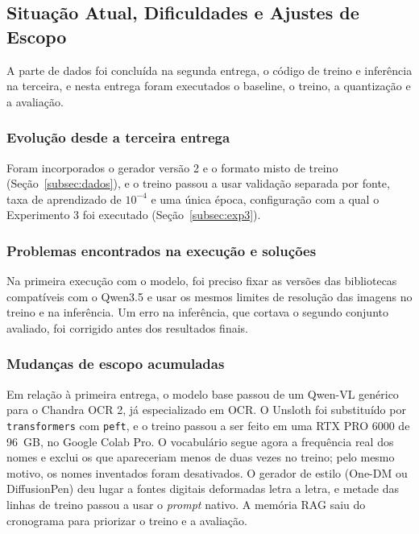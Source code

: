 \documentclass[12pt,a4paper]{article}
\begin{document}
\subsection{Situação Atual, Dificuldades e Ajustes de Escopo}
\label{subsec:ajustes}

A parte de dados foi concluída na segunda entrega, o código de treino e inferência na terceira, e nesta entrega foram executados o baseline, o treino, a quantização e a avaliação.

\subsubsection{Evolução desde a terceira entrega}
Foram incorporados o gerador versão 2 e o formato misto de treino (Seção~\ref{subsec:dados}), e o treino passou a usar validação separada por fonte, taxa de aprendizado de $10^{-4}$ e uma única época, configuração com a qual o Experimento 3 foi executado (Seção~\ref{subsec:exp3}).

\subsubsection{Problemas encontrados na execução e soluções}
\label{subsec:problemas}
Na primeira execução com o modelo, foi preciso fixar as versões das bibliotecas compatíveis com o Qwen3.5 e usar os mesmos limites de resolução das imagens no treino e na inferência. Um erro na inferência, que cortava o segundo conjunto avaliado, foi corrigido antes dos resultados finais.

\subsubsection{Mudanças de escopo acumuladas}
Em relação à primeira entrega, o modelo base passou de um Qwen-VL genérico para o Chandra OCR 2, já especializado em OCR. O Unsloth foi substituído por \texttt{transformers} com \texttt{peft}, e o treino passou a ser feito em uma RTX PRO 6000 de 96~GB, no Google Colab Pro. O vocabulário segue agora a frequência real dos nomes e exclui os que apareceriam menos de duas vezes no treino; pelo mesmo motivo, os nomes inventados foram desativados. O gerador de estilo (One-DM ou DiffusionPen) deu lugar a fontes digitais deformadas letra a letra, e metade das linhas de treino passou a usar o \emph{prompt} nativo. A memória RAG saiu do cronograma para priorizar o treino e a avaliação.
\end{document}
